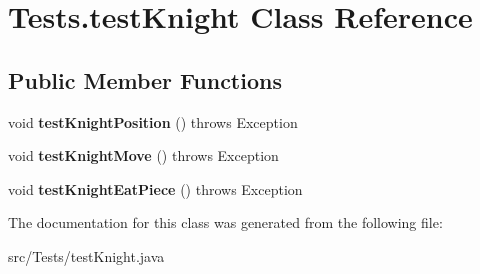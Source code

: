 \hypertarget{class_tests_1_1test_knight}{}\section{Tests.\+test\+Knight Class Reference}
\label{class_tests_1_1test_knight}
\subsection*{Public Member Functions}
\begin{DoxyCompactItemize}
\item 
\mbox{\label{class_tests_1_1test_knight_a94db8dd3a78fb06617f41c9f65afc720}} 
void {\bfseries test\+Knight\+Position} ()  throws Exception
\item 
\mbox{\label{class_tests_1_1test_knight_a6be8791814bf03e8c5d030d5be30076b}} 
void {\bfseries test\+Knight\+Move} ()  throws Exception
\item 
\mbox{\label{class_tests_1_1test_knight_a43117c691577b08e2d551607180010ea}} 
void {\bfseries test\+Knight\+Eat\+Piece} ()  throws Exception
\end{DoxyCompactItemize}


The documentation for this class was generated from the following file\+:\begin{DoxyCompactItemize}
\item 
src/\+Tests/test\+Knight.\+java\end{DoxyCompactItemize}
